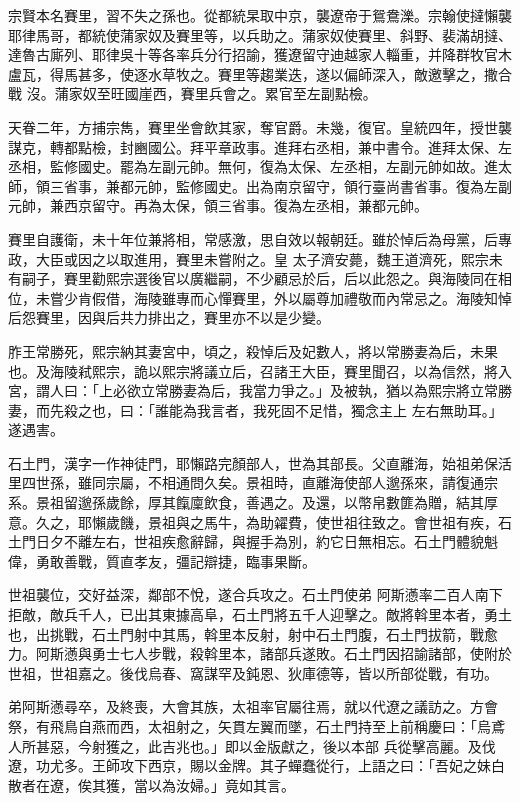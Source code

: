 \begin{pinyinscope}
 宗賢本名賽里，習不失之孫也。從都統杲取中京，襲遼帝于鴛鴦濼。宗翰使撻懶襲耶律馬哥，都統使蒲家奴及賽里等，以兵助之。蒲家奴使賽里、斜野、裴滿胡撻、達魯古廝列、耶律吳十等各率兵分行招諭，獲遼留守迪越家人輜重，并降群牧官木盧瓦，得馬甚多，使逐水草牧之。賽里等趨業迭，遂以偏師深入，敵邀擊之，撒合戰
 沒。蒲家奴至旺國崖西，賽里兵會之。累官至左副點檢。



 天眷二年，方捕宗雋，賽里坐會飲其家，奪官爵。未幾，復官。皇統四年，授世襲謀克，轉都點檢，封豳國公。拜平章政事。進拜右丞相，兼中書令。進拜太保、左丞相，監修國史。罷為左副元帥。無何，復為太保、左丞相，左副元帥如故。進太師，領三省事，兼都元帥，監修國史。出為南京留守，領行臺尚書省事。復為左副元帥，兼西京留守。再為太保，領三省事。復為左丞相，兼都元帥。



 賽里自護衛，未十年位兼將相，常感激，思自效以報朝廷。雖於悼后為母黨，后專政，大臣或因之以取進用，賽里未嘗附之。皇
 太子濟安薨，魏王道濟死，熙宗未有嗣子，賽里勸熙宗選後官以廣繼嗣，不少顧忌於后，后以此怨之。與海陵同在相位，未嘗少肯假借，海陵雖專而心憚賽里，外以屬尊加禮敬而內常忌之。海陵知悼后怨賽里，因與后共力排出之，賽里亦不以是少變。



 胙王常勝死，熙宗納其妻宮中，頃之，殺悼后及妃數人，將以常勝妻為后，未果也。及海陵弒熙宗，詭以熙宗將議立后，召諸王大臣，賽里聞召，以為信然，將入宮，謂人曰：「上必欲立常勝妻為后，我當力爭之。」及被執，猶以為熙宗將立常勝妻，而先殺之也，曰：「誰能為我言者，我死固不足惜，獨念主上
 左右無助耳。」遂遇害。



 石土門，漢字一作神徒門，耶懶路完顏部人，世為其部長。父直離海，始祖弟保活里四世孫，雖同宗屬，不相通問久矣。景祖時，直離海使部人邈孫來，請復通宗系。景祖留邈孫歲餘，厚其餼廩飲食，善遇之。及還，以幣帛數篚為贈，結其厚意。久之，耶懶歲饑，景祖與之馬牛，為助糴費，使世祖往致之。會世祖有疾，石土門日夕不離左右，世祖疾愈辭歸，與握手為別，約它日無相忘。石土門體貌魁偉，勇敢善戰，質直孝友，彊記辯捷，臨事果斷。



 世祖襲位，交好益深，鄰部不悅，遂合兵攻之。石土門使弟
 阿斯懣率二百人南下拒敵，敵兵千人，已出其東據高阜，石土門將五千人迎擊之。敵將斡里本者，勇土也，出挑戰，石土門射中其馬，斡里本反射，射中石土門腹，石土門拔箭，戰愈力。阿斯懣與勇士七人步戰，殺斡里本，諸部兵遂敗。石土門因招諭諸部，使附於世祖，世祖嘉之。後伐烏春、窩謀罕及鈍恩、狄庫德等，皆以所部從戰，有功。



 弟阿斯懣尋卒，及終喪，大會其族，太祖率官屬往焉，就以代遼之議訪之。方會祭，有飛鳥自燕而西，太祖射之，矢貫左翼而墜，石土門持至上前稱慶曰：「烏鳶人所甚惡，今射獲之，此吉兆也。」即以金版獻之，後以本部
 兵從擊高麗。及伐遼，功尤多。王師攻下西京，賜以金牌。其子蟬蠢從行，上語之曰：「吾妃之妹白散者在遼，俟其獲，當以為汝婦。」竟如其言。




\end{pinyinscope}
